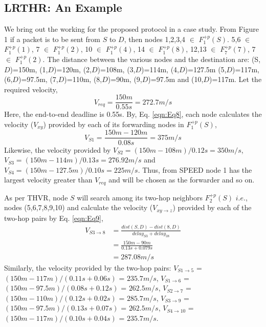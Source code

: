 \documentclass[fleqn,twoside]{article}
\begin{document}
\subsection{LRTHR: An Example}
We bring out the working for the proposed protocol in a case study. From Figure 1 if a packet is to be sent from $S$ to $D$, then 
nodes {1,2,3,4} $\in$ $F_{1}^{+p}(S)$. {5,6} $\in$ $F_{1}^{+p}(1)$, 
{7} $\in$ $F_{1}^{+p}(2)$, {10} $\in$ $F_{1}^{+p}(4)$, {14} $\in$ $F_{1}^{+p}(8)$, {12,13} $\in$ $F_{7}^{+p}(7)$, {7} $\in$ $F_{1}^{+p}(2)$. 
The distance between the various nodes and the destination are: (S,$D$)=150m, (1,$D$)=120m, (2,$D$)=108m, (3,$D$)=114m, (4,$D$)=127.5m
(5,$D$)=117m, (6,$D$)=97.5m, (7,$D$)=110m, (8,$D$)=90m, (9,$D$)=97.5m and (10,$D$)=117m. Let the required velocity, 
\begin{equation*}
V_{req} = \frac{150m}{0.55s} = 272.7m/s
\label{eqn:Eq13}
\end{equation*}
Here, the end-to-end deadline is 0.55s. By, Eq. \ref{eqn:Eq8}, each node calculates the velocity ($V_{xy}$) provided by each
of its forwarding nodes in $F_1^{+p}(S)$,
\begin{equation*}
V_{S1} = \frac{150m-120m}{0.08s} = 375m/s
\label{eqn:Eq14}
\end{equation*}
Likewise, the velocity provided by $V_{S2}=(150m-108m)/0.12s=350m/s$, $V_{S3}=(150m-114m)/0.13s=276.92m/s$ 
and $V_{S4}=(150m-127.5m)/0.10s=225m/s$. Thus, from SPEED node 1 has the largest velocity greater than $V_{req}$
and will be chosen as the forwarder and so on.

As per THVR, node $S$ will search among its two-hop neighbors $F_2^{+p}(S)$ $i.e.$, nodes (5,6,7,8,9,10) and calculate
the velocity ($V_{xy\rightarrow z}$) provided by each of the two-hop pairs by Eq. \ref{eqn:Eq9},
\begin{equation*}
\begin{split}
V_{S3\rightarrow 8}& = \frac{dist(S,D) - dist(8,D)}{delay_{S3} + delay_{38}} \\ 
		   & = \frac{150m-90m}{0.13s + 0.079s} \\
		   & = 287.08m/s
\label{eqn:Eq15}
\end{split}
\end{equation*}
Similarly, the velocity provided by the two-hop pairs: $V_{S1\rightarrow 5}$ = $(150m-117m)/(0.11s+0.06s)$ = $235.7m/s$,  
$V_{S1\rightarrow 6}$ = $(150m-97.5m)/(0.08s+0.12s)$ = $262.5m/s$, $V_{S2\rightarrow 7}$ = $(150m-110m)/(0.12s+0.02s)$ = $285.7m/s$,
$V_{S3\rightarrow 9}$ = $(150m-97.5m)/(0.13s+0.07s)$ = $262.5m/s$, $V_{S4\rightarrow 10}$ = $(150m-117m)/(0.10s+0.04s)$ = $235.7m/s$.
\end{document}
